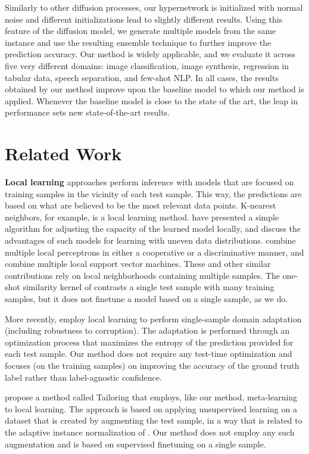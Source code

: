 \documentclass{article}
\theoremstyle{plain}
\begin{document}
Similarly to other diffusion processes, our hypernetwork is initialized with normal noise and different initializations lead to slightly different results. Using this feature of the diffusion model, we  generate multiple models from the same instance and use the resulting ensemble technique to further improve the prediction accuracy. Our method is widely applicable, and  we evaluate it across five very different domains: image classification, image synthesis, regression in tabular data, speech separation, and few-shot NLP. In all cases, the results obtained by our method improve upon the baseline model to which our method is applied. Whenever the baseline model is close to the state of the art, the leap in  performance sets new state-of-the-art results.

\section{Related Work}

{\bf Local learning} approaches perform inference with models that are focused on training samples in the vicinity of each test sample. This way, the predictions are based on what are believed to be the most relevant data points. K-nearest neighbors, for example, is a local learning method. \citet{6797141} have presented a simple algorithm for adjusting the capacity of the learned model locally, and discuss the advantages of such models for learning with uneven data distributions. \citet{alpaydin1996local} combine multiple local perceptrons in either a cooperative or a discriminative manner, and \citet{zhang2006svm} combine multiple local support vector machines. These and other similar contributions rely on local neighborhoods containing multiple samples. The one-shot similarity kernel of \citet{wolf2009one} contrasts a single test sample with many training samples, but it does not finetune a model based on a single sample, as we do.



More recently, \citet{wang2021tent} employ local learning to perform single-sample domain adaptation (including robustness to corruption). The adaptation is performed through an optimization process that maximizes the entropy of the prediction provided for each test sample. Our method does not require any test-time optimization and focuses (on the training samples) on improving the accuracy of the ground truth label rather than label-agnostic confidence. 

\citet{alet2021tailoring} propose a method called Tailoring that employs, like our method, meta-learning to local learning. The approach is based on applying unsupervised learning on a dataset that is created by augmenting the test sample, in a way that is related to the adaptive instance normalization of \citet{huang2017arbitrary}. Our method does not employ any such augmentation and is based on supervised finetuning on a single sample.
\end{document}
